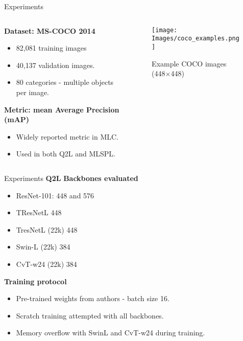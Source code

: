 \begin{frame}{Experiments}
\begin{columns}
  \begin{column}{0.55\textwidth}
    \textbf{Dataset: MS-COCO 2014}
    \begin{itemize}
      \item 82,081 training images
      \item 40,137 validation images.
      \item 80 categories - multiple objects per image.
    \end{itemize}
    \vspace{0.4em}
    \textbf{Metric: mean Average Precision (mAP)}
    \begin{itemize}
      \item Widely reported metric in MLC.
      \item Used in both Q2L and MLSPL.
    \end{itemize}
  \end{column}
  \begin{column}{0.4\textwidth}
        \begin{figure}[b]
        \centering
        \texttt{[image: Images/coco\_examples.png]}
        \caption*{\tiny Example COCO images (448$\times$448)}
    \end{figure}
  \end{column}
\end{columns}
\end{frame}

\begin{frame}{Experiments}
  \textbf{Q2L}
\textbf{Backbones evaluated}
\begin{itemize}
  \item ResNet-101: 448 and 576
  \item TResNetL 448
  \item TresNetL (22k) 448
  \item Swin-L (22k) 384
  \item CvT-w24 (22k) 384
\end{itemize}
\textbf{Training protocol}
\begin{itemize}
  \item Pre-trained weights from authors - batch size 16.
  \item Scratch training attempted with all backbones.
  \item Memory overflow with SwinL and CvT-w24 during training.
\end{itemize}
\end{frame}



